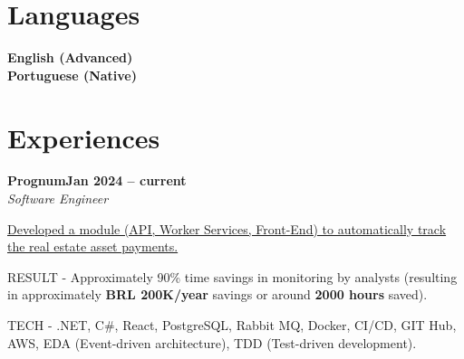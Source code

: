 \documentclass[letterpaper,10pt]{article}
\newcommand{\heading}[2]{
  \hspace{10pt}#1\hfill#2\\
}
\newcommand{\headingBf}[2]{
  \heading{\textbf{#1}}{\textbf{#2}}
}
\newcommand{\headingIt}[2]{
  \heading{\textit{#1}}{\textit{#2}}
}
\newenvironment{resume_list}{
  \vspace{-7pt}
  \begin{itemize}[itemsep=-2px, parsep=1pt, leftmargin=30pt]
}{
  \end{itemize}
}
\newcommand{\itemTitle}[1]{
  \item[] \underline{#1}\vspace{4pt}
}
\begin{document}
\section{Languages}

\begin{multicols}{2}
    \headingBf{English (Advanced)}{}
    
    
    \headingBf{Portuguese (Native)}{}
\end{multicols}

  

  \section{Experiences}

  \headingBf{Prognum}{Jan 2024 -- current}
  \headingIt{Software Engineer}{}
  \begin{resume_list}
    \itemTitle{Developed a module (API, Worker Services, Front-End) to automatically track the real estate asset payments.}
    \item RESULT - Approximately 90\% time savings in monitoring by analysts (resulting in approximately \textbf{BRL 200K/year} savings or around \textbf{2000 hours} saved).
    \item TECH - .NET, C\#, React, PostgreSQL, Rabbit MQ, Docker, CI/CD, GIT Hub, AWS, EDA (Event-driven architecture), TDD (Test-driven development).
  \end{resume_list}
\end{document}

